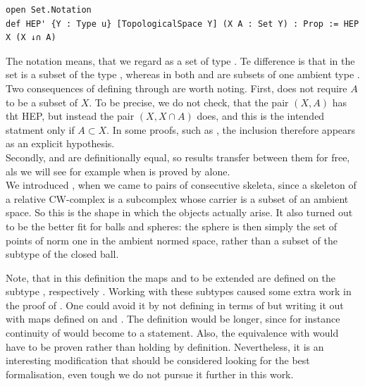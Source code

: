 \documentclass[11pt, a4paper, english]{article}
\theoremstyle{plain}
\theoremstyle{definition}
\theoremstyle{remark}
\numberwithin{equation}{section}
\numberwithin{theorem}{section}
\begin{document}
\begin{verbatim}
open Set.Notation
def HEP' {Y : Type u} [TopologicalSpace Y] (X A : Set Y) : Prop := HEP X (X ↓∩ A) 
\end{verbatim}

The notation  means, that we regard  as a set of type . Te difference is that in  the set  is a subset of the type , whereas in  both  and  are subsets of one ambient type .\\
Two consequences of defining  through  are worth noting. First,  does not require $A$ to be a subset of $X$. To be precise, we do not check, that the pair $(X,A)$ has tht HEP, but instead the pair $(X, X \cap A)$ does, and this is the intended statment only if $A \subset X$. In some proofs, such as , the inclusion therefore appears as an explicit hypothesis.\\
Secondly,  and  are definitionally equal, so results transfer between them for free, als we will see for example when  is proved by  alone. \\

We introduced , when we came to pairs of consecutive skeleta, since a skeleton of a relative CW-complex is a subcomplex whose carrier is a subset of an ambient space. So this is the shape in which the objects actually arise. It also turned out to be the better fit for balls and spheres: the sphere is then simply the set of points of norm one in the ambient normed space, rather than a subset of the subtype of the closed ball. 

Note, that in this definition the maps  and  to be extended are defined on the subtype , respectively . Working with these subtypes caused some extra work in the proof of . One could avoid it by not defining  in terms of  but writing it out with maps defined on  and . The definition would be longer, since for instance continuity of  would become to a  statement. Also, the equivalence with  would have to be proven rather than holding by definition. Nevertheless, it is an interesting modification that should be considered looking for the best formalisation, even tough we do not pursue it further in this work. \\
\end{document}

